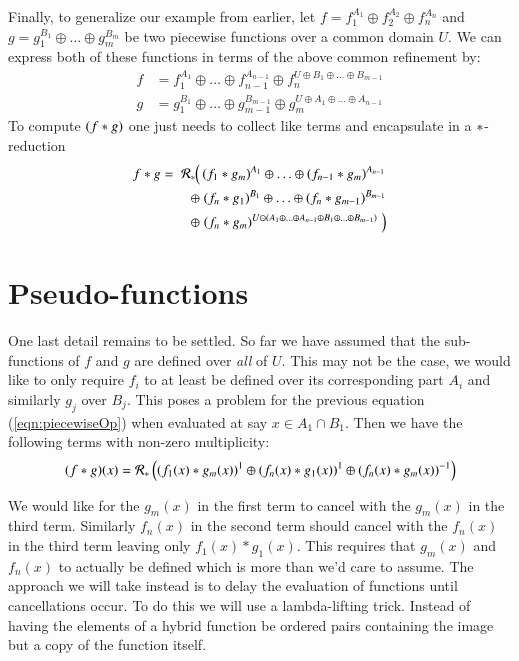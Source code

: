 Finally, to generalize our example from earlier, let $f = f_1^{A_1} \oplus f_2^{A_2} \oplus f_n^{A_n}$
and  $g = g_1^{B_1} \oplus \ldots \oplus g_m^{B_m}$ be two piecewise functions over a common domain $U$.
We can express both of these functions in terms of the above common refinement by:
\begin{align*}
	f &= f_1^{A_1} \oplus \ldots \oplus f_{n-1}^{A_{n-1}} \oplus f_n^{U \oplus B_1 \oplus \ldots \oplus B_{m-1}} \\
	g &= g_1^{B_1} \oplus\ldots \oplus g_{m-1}^{B_{m-1}} \oplus g_m^{U \oplus A_1 \oplus\ldots \oplus A_{n-1}}
\end{align*}
To compute $(f * g)$ one just needs to collect like terms and encapsulate in a $*$-reduction
\begin{align}
	\label{eqn:piecewiseOp}
	f * g = \; \mathcal{R}_*  \; & \!\!\! \left( \,
			(f_1 * g_m)^{A_1} 
			\oplus \ldots \oplus 
			 (f_{n-1} * g_m)^{A_{n-1}} \right. \notag \\
		\oplus & \;
			 (f_n * g_1)^{B_1} 
			\oplus \ldots \oplus 
			 (f_n * g_{m-1})^{B_{m-1}} \\
		\oplus & \left. 
			 (f_n * g_m)^{U \ominus (A_1 \oplus \ldots \oplus A_{n-1} \oplus B_1 \oplus \ldots \oplus B_{m-1})}
		\; \right) \notag
\end{align}

  
  



%
%
\section{Pseudo-functions}


One last detail remains to be settled.
So far we have assumed that the sub-functions of $f$ and $g$ are defined over \emph{all} of $U$.
This may not be the case, we would like to only require $f_i$ to at least be defined over its corresponding part $A_i$
and similarly $g_j$ over $B_j$.
This poses a problem for the previous equation (\ref{eqn:piecewiseOp}) when evaluated at say $x \in A_1 \cap B_1$.
Then we have the following terms with non-zero multiplicity:
\begin{equation*}
	(f * g)(x) = 
		\mathcal{R}_* \left(   
			(f_1(x) * g_m(x))^1 \oplus 
			(f_n(x) * g_1(x))^1 \oplus 
			(f_n(x) * g_m(x))^{-1} 
		\right)
\end{equation*}


We would like for the $g_m(x)$ in the first term to cancel with the $g_m(x)$ in the third term.
Similarly $f_n(x)$ in the second term should cancel with the $f_n(x)$ in the third term leaving only $f_1(x) * g_1(x)$.
This requires that $g_m(x)$ and $f_n(x)$ to actually be defined which is more than we'd care to assume.
The approach we will take instead is to delay the evaluation of functions until cancellations occur.
To do this we will use a lambda-lifting trick.
Instead of having the elements of a hybrid function be ordered pairs containing the image but a copy of the function itself.



